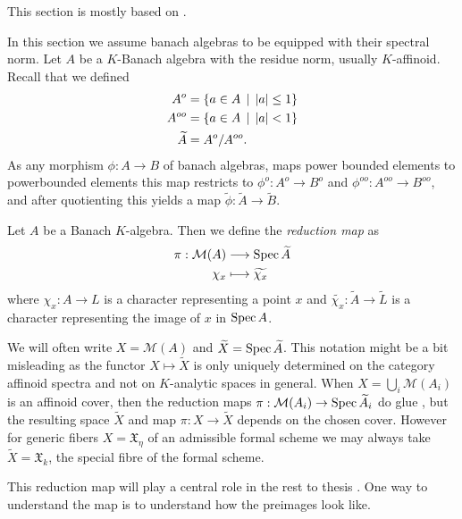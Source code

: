 This section is mostly based on \cite[sec.\ 2.4]{berkovichSpectralTheoryAnalytic2012}. 


In this section we assume banach algebras to be equipped with their spectral norm. 
Let $A$ be a $K$-Banach algebra with the residue norm, usually $K$-affinoid. Recall that we defined 
\begin{align*}
	A^{o} &=  \{a \in A \st |a| \le 1\}  \\
	A^{oo} &=  \{a \in A \st |a| < 1\}  \\
	\widetilde A &= A^{o} / A^{oo} 
.\end{align*}
As any morphism $\phi: A \to B$ of banach algebras, maps power bounded elements to powerbounded elements this map restricts to $\phi ^{o}: A ^{o} \to B^{o}$ and  $\phi ^{oo}: A ^{oo} \to B^{oo}$, and after quotienting this yields a map $\widetilde \phi: \widetilde A \to \widetilde B$. 

\begin{definition}
	Let $A$ be a Banach $K$-algebra. Then we define the \emph{reduction map} as 
	\begin{align*}
		\pi: \mathcal{M} (A) &\longrightarrow \operatorname{Spec} \widetilde A \\
		\chi_x &\longmapsto \widetilde {\chi_x}
	\end{align*}
	where $\chi_x: A \to L$ is a character representing a point $x$ and $\widetilde {\chi_x}: \widetilde A \to \widetilde L$ is a character representing the image of $x$ in $\operatorname{Spec} A$.  
\end{definition}
We will often write $X = \mathcal{M} (A)$ and $\widetilde X = \operatorname{Spec} \widetilde A$. 
This notation might be a bit misleading as the functor $X \mapsto \widetilde X$ is only uniquely determined on the category affinoid spectra and not on $K$-analytic spaces in general. 
When $X = \bigcup_{i} \mathcal{M} (A_i)$ is an affinoid cover, then the reduction maps $\pi: \mathcal{M} (A_i) \to \operatorname{Spec} \widetilde A_i$ do glue , but the resulting space  $\widetilde X$ and map $\pi: X \to \widetilde X$ depends on the chosen cover.  
However for generic fibers $X = \mathfrak{X} _\eta$ of an admissible formal scheme we may always take $\widetilde X = \mathfrak{X} _k$, the special fibre of the formal scheme.

This reduction map will play a central role in the rest to thesis . 
One way to understand the map is to understand how the preimages look like. 

